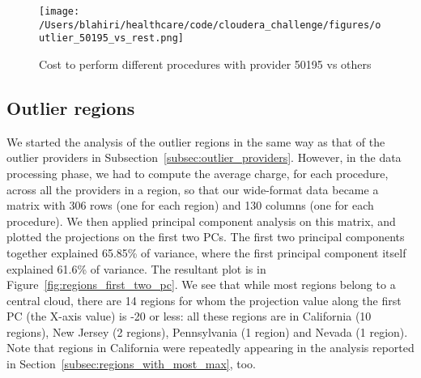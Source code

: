 \begin{figure*}[!h]
    \centering
    \texttt{[image: /Users/blahiri/healthcare/code/cloudera\_challenge/figures/outlier\_50195\_vs\_rest.png]}
    \caption{\small Cost to perform different procedures with provider 50195 vs others}
    \label{fig:outlier_50195_vs_rest}
\end{figure*} 

\subsection{Outlier regions}
\label{subsec:outlier_regions}
We started the analysis of the outlier regions in the same way as that of the outlier providers in Subsection~\ref{subsec:outlier_providers}. However, in the data processing phase, we had to compute the average charge, for each procedure, across all the providers in a region, so that our wide-format data became a matrix with 306 rows (one for each region) and 130 columns (one for each procedure). We then applied principal component analysis on this matrix, and plotted the projections on the first two PCs. The first two principal components together explained 65.85\% of variance, where the first principal component itself explained 61.6\% of variance. The resultant plot is in Figure~\ref{fig:regions_first_two_pc}. We see that while most regions belong to a central cloud, there are 14 regions for whom the projection value along the first PC (the X-axis value) is -20 or less: all these regions are in California (10 regions), New Jersey (2 regions), Pennsylvania (1 region) and Nevada (1 region). Note that regions in California were repeatedly appearing in the analysis reported in Section~\ref{subsec:regions_with_most_max}, too.\\ 

